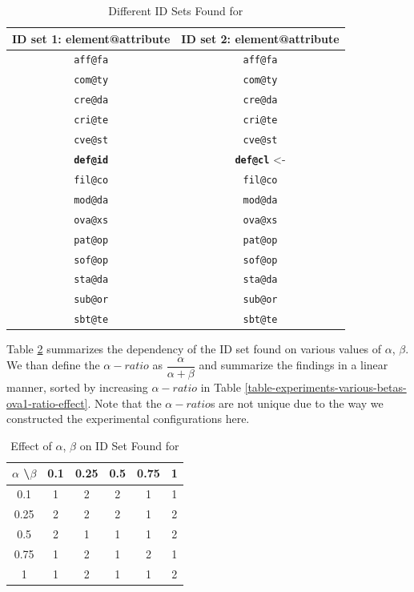 \begin{table}
  \caption{Different ID Sets Found for }
  \bigskip
  \label{table-experiments-various-betas-ova1}
  \centering
  \begin{tabular}{c || c}
    ID set \textbf{1}: element@attribute & ID set \textbf{2}: element@attribute \\
    \hline
    \texttt{aff@fa} & \texttt{aff@fa} \\
    \texttt{com@ty} & \texttt{com@ty} \\
    \texttt{cre@da} & \texttt{cre@da} \\
    \texttt{cri@te} & \texttt{cri@te} \\
    \texttt{cve@st} & \texttt{cve@st} \\
    \texttt{\textbf{def@id}} & \texttt{\textbf{def@cl}} <- \\ %
    \texttt{fil@co} & \texttt{fil@co} \\
    \texttt{mod@da} & \texttt{mod@da} \\
    \texttt{ova@xs} & \texttt{ova@xs} \\
    \texttt{pat@op} & \texttt{pat@op} \\
    \texttt{sof@op} & \texttt{sof@op} \\
    \texttt{sta@da} & \texttt{sta@da} \\
    \texttt{sub@or} & \texttt{sub@or} \\
    \texttt{sbt@te} & \texttt{sbt@te} \\
  \end{tabular}
\end{table}

Table \ref{table-experiments-various-betas-ova1-effect} summarizes the dependency of the ID set found on various values of $\alpha$, $\beta$. We than define the $\alpha-ratio$ as $ \dfrac{\alpha}{\alpha + \beta} $ and summarize the findings in a linear manner, sorted by increasing $\alpha-ratio$ in Table \ref{table-experiments-various-betas-ova1-ratio-effect}. Note that the $\alpha-ratio$s are not unique due to the way we constructed the experimental configurations here.

\begin{table}
  \caption{Effect of $\alpha$, $\beta$ on ID Set Found for }
  \bigskip
  \label{table-experiments-various-betas-ova1-effect}
  \centering
  \begin{tabular}{c | c  c  c  c  c}
    $\alpha$ \textbackslash $\beta$ & 0.1 & 0.25 & 0.5 & 0.75 & 1 \\
    \hline
    0.1  & 1 & 2 & 2 & 1 & 1 \\
    0.25 & 2 & 2 & 2 & 1 & 2 \\
    0.5  & 2 & 1 & 1 & 1 & 2 \\
    0.75 & 1 & 2 & 1 & 2 & 1 \\
    1    & 1 & 2 & 1 & 1 & 2 \\
  \end{tabular}
\end{table}

